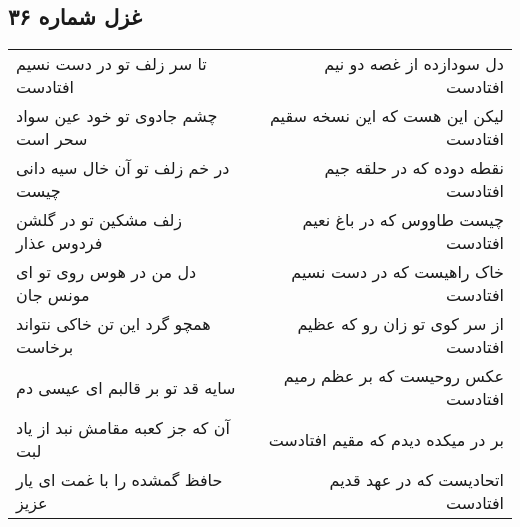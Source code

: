 \begin{center}
\section*{غزل شماره ۳۶}
\label{sec:sh036}
\begin{longtable}{l p{0.5cm} r}
تا سر زلف تو در دست نسیم افتادست
&&
دل سودازده از غصه دو نیم افتادست
\\
چشم جادوی تو خود عین سواد سحر است
&&
لیکن این هست که این نسخه سقیم افتادست
\\
در خم زلف تو آن خال سیه دانی چیست
&&
نقطه دوده که در حلقه جیم افتادست
\\
زلف مشکین تو در گلشن فردوس عذار
&&
چیست طاووس که در باغ نعیم افتادست
\\
دل من در هوس روی تو ای مونس جان
&&
خاک راهیست که در دست نسیم افتادست
\\
همچو گرد این تن خاکی نتواند برخاست
&&
از سر کوی تو زان رو که عظیم افتادست
\\
سایه قد تو بر قالبم ای عیسی دم
&&
عکس روحیست که بر عظم رمیم افتادست
\\
آن که جز کعبه مقامش نبد از یاد لبت
&&
بر در میکده دیدم که مقیم افتادست
\\
حافظ گمشده را با غمت ای یار عزیز
&&
اتحادیست که در عهد قدیم افتادست
\\
\end{longtable}
\end{center}
